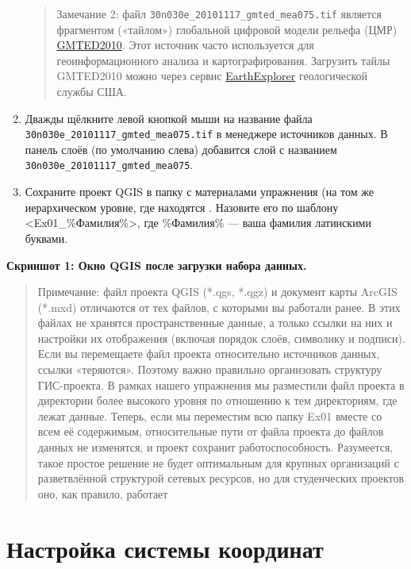 \documentclass[
  12pt,
]{book}
\begin{document}
\begin{enumerate}
  \begin{quote}
  Замечание 2: файл \texttt{30n030e\_20101117\_gmted\_mea075.tif} является фрагментом («тайлом») глобальной цифровой модели рельефа (ЦМР) \href{https://www.usgs.gov/land-resources/eros/coastal-changes-and-impacts/gmted2010}{GMTED2010}. Этот источник часто используется для геоинформационного анализа и картографирования. Загрузить тайлы GMTED2010 можно через сервис \href{https://earthexplorer.usgs.gov/}{EarthExplorer} геологической службы США.
  \end{quote}
\item
  Дважды щёлкните левой кнопкой мыши на название файла \texttt{30n030e\_20101117\_gmted\_mea075.tif} в менеджере источников данных. В панель слоёв (по умолчанию слева) добавится слой с названием \texttt{30n030e\_20101117\_gmted\_mea075}.
\item
  Сохраните проект QGIS в папку с материалами упражнения (на том же иерархическом уровне, где находятся . Назовите его по шаблону \textless Ex01\_\%Фамилия\%\textgreater, где \%Фамилия\% --- ваша фамилия латинскими буквами.
\end{enumerate}

\textbf{Скриншот 1: Окно QGIS после загрузки набора данных.}

\begin{quote}
Примечание: файл проекта QGIS (*.qgs, *.qgz) и документ карты ArcGIS (*.mxd) отличаются от тех файлов, с которыми вы работали ранее. В этих файлах не хранятся пространственные данные, а только ссылки на них и настройки их отображения (включая порядок слоёв, символику и подписи). Если вы перемещаете файл проекта относительно источников данных, ссылки «теряются». Поэтому важно правильно организовать структуру ГИС-проекта. В рамках нашего упражнения мы разместили файл проекта в директории более высокого уровня по отношению к тем директориям, где лежат данные. Теперь, если мы переместим всю папку Ex01 вместе со всем её содержимым, относительные пути от файла проекта до файлов данных не изменятся, и проект сохранит работоспособность. Разумеется, такое простое решение не будет оптимальным для крупных организаций с разветвлённой структурой сетевых ресурсов, но для студенческих проектов оно, как правило, работает
\end{quote}

\hypertarget{map-design-general-projection}{%
\section{Настройка системы координат}\label{map-design-general-projection}}
\end{document}
